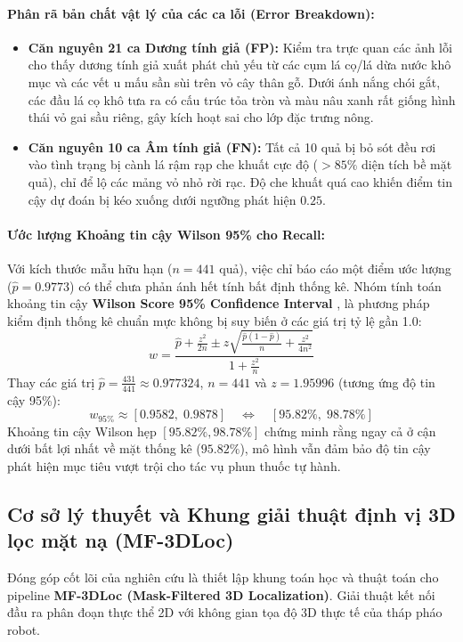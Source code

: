 \documentclass[12pt,a4paper]{article}
\begin{document}
\paragraph{Phân rã bản chất vật lý của các ca lỗi (Error Breakdown):}
\begin{itemize}
    \item \textbf{Căn nguyên 21 ca Dương tính giả (FP):} Kiểm tra trực quan các ảnh lỗi cho thấy dương tính giả xuất phát chủ yếu từ các cụm lá cọ/lá dừa nước khô mục và các vết u mấu sần sùi trên vỏ cây thân gỗ. Dưới ánh nắng chói gắt, các đầu lá cọ khô tưa ra có cấu trúc tỏa tròn và màu nâu xanh rất giống hình thái vỏ gai sầu riêng, gây kích hoạt sai cho lớp đặc trưng nông.
    \item \textbf{Căn nguyên 10 ca Âm tính giả (FN):} Tất cả 10 quả bị bỏ sót đều rơi vào tình trạng bị cành lá rậm rạp che khuất cực độ ($>85\%$ diện tích bề mặt quả), chỉ để lộ các mảng vỏ nhỏ rời rạc. Độ che khuất quá cao khiến điểm tin cậy dự đoán bị kéo xuống dưới ngưỡng phát hiện $0.25$.
\end{itemize}

\paragraph{Ước lượng Khoảng tin cậy Wilson 95\% cho Recall:}
Với kích thước mẫu hữu hạn ($n = 441$ quả), việc chỉ báo cáo một điểm ước lượng ($\hat{p} = 0.9773$) có thể chưa phản ánh hết tính bất định thống kê. Nhóm tính toán khoảng tin cậy \textbf{Wilson Score 95\% Confidence Interval} \cite{wilson1927probable}, là phương pháp kiểm định thống kê chuẩn mực không bị suy biến ở các giá trị tỷ lệ gần 1.0:
\begin{equation}
w = \frac{\hat{p} + \frac{z^2}{2n} \pm z \sqrt{\frac{\hat{p}(1 - \hat{p})}{n} + \frac{z^2}{4n^2}}}{1 + \frac{z^2}{n}}
\label{eq:wilson_ci}
\end{equation}
Thay các giá trị $\hat{p} = \frac{431}{441} \approx 0.977324$, $n = 441$ và $z = 1.95996$ (tương ứng độ tin cậy 95\%):
\begin{equation}
w_{95\%} \approx [0.9582, \; 0.9878] \quad \Longleftrightarrow \quad [95.82\%, \; 98.78\%]
\end{equation}
Khoảng tin cậy Wilson hẹp $[95.82\%, 98.78\%]$ chứng minh rằng ngay cả ở cận dưới bất lợi nhất về mặt thống kê ($95.82\%$), mô hình vẫn đảm bảo độ tin cậy phát hiện mục tiêu vượt trội cho tác vụ phun thuốc tự hành.

\subsection{Cơ sở lý thuyết và Khung giải thuật định vị 3D lọc mặt nạ (MF-3DLoc)}
\label{sec:mf_3dloc}
Đóng góp cốt lõi của nghiên cứu là thiết lập khung toán học và thuật toán cho pipeline \textbf{MF-3DLoc (Mask-Filtered 3D Localization)}. Giải thuật kết nối đầu ra phân đoạn thực thể 2D với không gian tọa độ 3D thực tế của tháp pháo robot.
\end{document}
